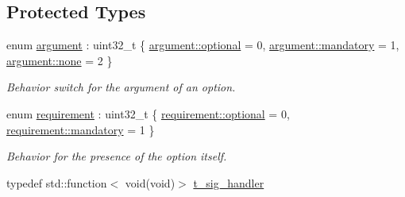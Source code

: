 \subsection*{Protected Types}
\begin{DoxyCompactItemize}
\item 
enum \hyperlink{classxtd_1_1Application_a672c075ed901e463609077d571a714c7}{argument} \-: uint32\-\_\-t \{ \hyperlink{classxtd_1_1Application_a672c075ed901e463609077d571a714c7ad57c24f3fe52d16e7169b912dd647f0d}{argument\-::optional} = 0, 
\hyperlink{classxtd_1_1Application_a672c075ed901e463609077d571a714c7ac5e3b9675d114c21ad3367d318f6aa95}{argument\-::mandatory} = 1, 
\hyperlink{classxtd_1_1Application_a672c075ed901e463609077d571a714c7a334c4a4c42fdb79d7ebc3e73b517e6f8}{argument\-::none} = 2
 \}
\begin{DoxyCompactList}\small\item\em Behavior switch for the argument of an option. \end{DoxyCompactList}\item 
enum \hyperlink{classxtd_1_1Application_a49c0397e9fd22067e3a536443a17fe24}{requirement} \-: uint32\-\_\-t \{ \hyperlink{classxtd_1_1Application_a49c0397e9fd22067e3a536443a17fe24ad57c24f3fe52d16e7169b912dd647f0d}{requirement\-::optional} = 0, 
\hyperlink{classxtd_1_1Application_a49c0397e9fd22067e3a536443a17fe24ac5e3b9675d114c21ad3367d318f6aa95}{requirement\-::mandatory} = 1
 \}
\begin{DoxyCompactList}\small\item\em Behavior for the presence of the option itself. \end{DoxyCompactList}\item 
typedef std\-::function$<$ void(void)$>$ \hyperlink{classxtd_1_1Application_a907b6fe8247636495890e668530863d6}{t\-\_\-sig\-\_\-handler}
\end{DoxyCompactItemize}
